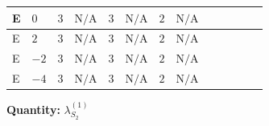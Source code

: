 \documentclass[8pt]{article}
\begin{document}
\begin{landscape}
\begin{longtable}{@{}llcccccc >{\raggedright\arraybackslash}p{0.21\linewidth} >{\raggedright\arraybackslash}p{0.21\linewidth} >{\raggedright\arraybackslash}p{0.21\linewidth}@{}}
E & $0$ & $3$ & $\text{N/A}$ & $3$ & $\text{N/A}$ & $2$ & $\text{N/A}$ & \scriptsize\adjustbox{max width=\linewidth}{$\begin{gathered} +4 {\lambda_{HS_2}^{(1)}}^2\end{gathered}$} & \scriptsize\adjustbox{max width=\linewidth}{$\begin{gathered} +14 {\lambda_{S_2}^{(1)}}^2\end{gathered}$} & \scriptsize\adjustbox{max width=\linewidth}{$\begin{gathered} +8 {\lambda_{S_2}^{(1)}} {\lambda_{S_2}^{(A)}}\end{gathered}$} \\
\midrule
E & $2$ & $3$ & $\text{N/A}$ & $3$ & $\text{N/A}$ & $2$ & $\text{N/A}$ & \scriptsize\adjustbox{max width=\linewidth}{$\begin{gathered} +4 {\lambda_{HS_2}^{(1)}}^2\end{gathered}$} & \scriptsize\adjustbox{max width=\linewidth}{$\begin{gathered} +14 {\lambda_{S_2}^{(1)}}^2\end{gathered}$} & \scriptsize\adjustbox{max width=\linewidth}{$\begin{gathered} +8 {\lambda_{S_2}^{(1)}} {\lambda_{S_2}^{(A)}}\end{gathered}$} \\
\midrule
E & $-2$ & $3$ & $\text{N/A}$ & $3$ & $\text{N/A}$ & $2$ & $\text{N/A}$ & \scriptsize\adjustbox{max width=\linewidth}{$\begin{gathered} +4 {\lambda_{HS_2}^{(1)}}^2\end{gathered}$} & \scriptsize\adjustbox{max width=\linewidth}{$\begin{gathered} +14 {\lambda_{S_2}^{(1)}}^2\end{gathered}$} & \scriptsize\adjustbox{max width=\linewidth}{$\begin{gathered} +8 {\lambda_{S_2}^{(1)}} {\lambda_{S_2}^{(A)}}\end{gathered}$} \\
\midrule
E & $-4$ & $3$ & $\text{N/A}$ & $3$ & $\text{N/A}$ & $2$ & $\text{N/A}$ & \scriptsize\adjustbox{max width=\linewidth}{$\begin{gathered} +4 {\lambda_{HS_2}^{(1)}}^2\end{gathered}$} & \scriptsize\adjustbox{max width=\linewidth}{$\begin{gathered} +14 {\lambda_{S_2}^{(1)}}^2\end{gathered}$} & \scriptsize\adjustbox{max width=\linewidth}{$\begin{gathered} +8 {\lambda_{S_2}^{(1)}} {\lambda_{S_2}^{(A)}}\end{gathered}$} \\
\midrule
\bottomrule
\end{longtable}
\clearpage
\noindent\textbf{Quantity: }$\lambda_{S_2}^{(1)}$\par\smallskip

\end{landscape}
\end{document}
